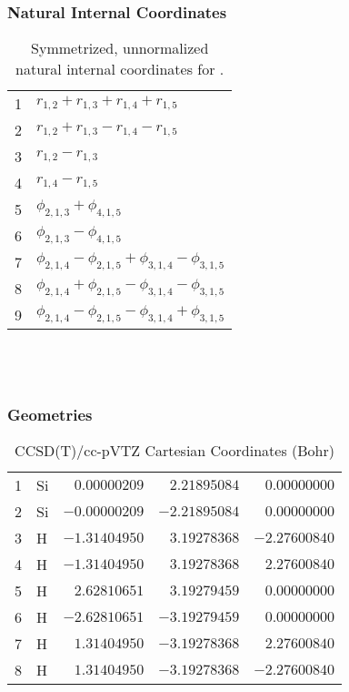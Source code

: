\documentclass[10pt,oneside]{article}
\begin{document}
\subsubsection*{Natural Internal Coordinates}
\begin{table}[h!]
\centering
\caption{Symmetrized, unnormalized natural internal coordinates for .}
\small
\begin{tabular}{ll}
  1   & $r_{1,2} + r_{1,3} + r_{1,4} + r_{1,5}$ \\
  2   & $r_{1,2} + r_{1,3} - r_{1,4} - r_{1,5}$ \\
  3   & $r_{1,2} - r_{1,3}$ \\
  4   & $r_{1,4} - r_{1,5}$ \\
  5   & $\phi_{2,1,3} + \phi_{4,1,5}$ \\
  6   & $\phi_{2,1,3} - \phi_{4,1,5}$ \\
  7   & $\phi_{2,1,4} - \phi_{2,1,5} + \phi_{3,1,4} - \phi_{3,1,5}$ \\
  8   & $\phi_{2,1,4} + \phi_{2,1,5} - \phi_{3,1,4} - \phi_{3,1,5}$ \\
  9   & $\phi_{2,1,4} - \phi_{2,1,5} - \phi_{3,1,4} + \phi_{3,1,5}$ \\
\end{tabular}
\end{table}

\clearpage

\subsection{\ \ \ }

\subsubsection*{Geometries}
\begin{table}[h!]
\centering
\caption{CCSD(T)/cc-pVTZ Cartesian Coordinates (Bohr)}
\begin{tabular}{llrrr}
1  & Si & $ 0.00000209$ & $ 2.21895084$ & $ 0.00000000$ \\
2  & Si & $-0.00000209$ & $-2.21895084$ & $ 0.00000000$ \\
3  & H  & $-1.31404950$ & $ 3.19278368$ & $-2.27600840$ \\
4  & H  & $-1.31404950$ & $ 3.19278368$ & $ 2.27600840$ \\
5  & H  & $ 2.62810651$ & $ 3.19279459$ & $ 0.00000000$ \\
6  & H  & $-2.62810651$ & $-3.19279459$ & $ 0.00000000$ \\
7  & H  & $ 1.31404950$ & $-3.19278368$ & $ 2.27600840$ \\
8  & H  & $ 1.31404950$ & $-3.19278368$ & $-2.27600840$ \\
\end{tabular}
\end{table}
\end{document}
